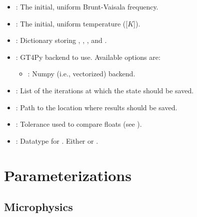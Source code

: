 \documentclass[letterpaper,10pt,english]{sphinxmanual}
\begin{document}
\begin{description}
\begin{itemize}
\item {} 
: The initial, uniform Brunt-Vaisala frequency.

\item {} 
: The initial, uniform temperature ({[}\(K\){]}).

\item {} 
: Dictionary storing ,               , ,          and .

\item {} 
: GT4Py backend to use. Available options are:
\begin{itemize}
\item {} 
: Numpy (i.e., vectorized) backend.

\end{itemize}

\item {} 
: List of the iterations at which the state should be saved.

\item {} 
: Path to the location where results should be saved.

\item {} 
: Tolerance used to compare floats (see ).

\item {} 
: Datatype for . Either  or .

\end{itemize}

\end{description}


\section{Parameterizations}
\label{\detokenize{api:parameterizations}}

\subsection{Microphysics}
\label{\detokenize{api:microphysics}}
\end{document}
